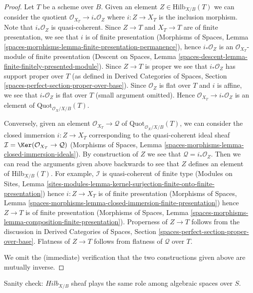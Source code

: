 \begin{proof}
Let $T$ be a scheme over $B$. Given an element
$Z \in \text{Hilb}_{X/B}(T)$ we can consider the
quotient $\mathcal{O}_{X_T} \to i_*\mathcal{O}_Z$
where $i : Z \to X_T$ is the inclusion morphism.
Note that $i_*\mathcal{O}_Z$ is quasi-coherent.
Since $Z \to T$ and $X_T \to T$ are of finite presentation,
we see that $i$ is of finite presentation (Morphisms of Spaces, Lemma
\ref{spaces-morphisms-lemma-finite-presentation-permanence}), hence
$i_*\mathcal{O}_Z$ is an $\mathcal{O}_{X_T}$-module of
finite presentation (Descent on Spaces, Lemma
\ref{spaces-descent-lemma-finite-finitely-presented-module}).
Since $Z \to T$ is proper we see that $i_*\mathcal{O}_Z$
has support proper over $T$ (as defined in
Derived Categories of Spaces, Section
\ref{spaces-perfect-section-proper-over-base}).
Since $\mathcal{O}_Z$ is flat
over $T$ and $i$ is affine, we see that $i_*\mathcal{O}_Z$
is flat over $T$ (small argument omitted). Hence
$\mathcal{O}_{X_T} \to i_*\mathcal{O}_Z$
is an element of $\text{Quot}_{\mathcal{O}_X/X/B}(T)$.

\medskip\noindent
Conversely, given an element $\mathcal{O}_{X_T} \to \mathcal{Q}$
of $\text{Quot}_{\mathcal{O}_X/X/B}(T)$, we can consider
the closed immersion $i : Z \to X_T$ corresponding to
the quasi-coherent ideal sheaf
$\mathcal{I} = \Ker(\mathcal{O}_{X_T} \to \mathcal{Q})$
(Morphisms of Spaces, Lemma
\ref{spaces-morphisms-lemma-closed-immersion-ideals}).
By construction of $Z$ we see that $\mathcal{Q} = i_*\mathcal{O}_Z$.
Then we can read the arguments given above backwards to see
that $Z$ defines an element of $\text{Hilb}_{X/B}(T)$.
For example, $\mathcal{I}$ is quasi-coherent of finite type
(Modules on Sites, Lemma
\ref{sites-modules-lemma-kernel-surjection-finite-onto-finite-presentation})
hence $i : Z \to X_T$ is of finite presentation
(Morphisms of Spaces, Lemma
\ref{spaces-morphisms-lemma-closed-immersion-finite-presentation})
hence $Z \to T$ is of finite presentation
(Morphisms of Spaces, Lemma
\ref{spaces-morphisms-lemma-composition-finite-presentation}).
Properness of $Z \to T$ follows from the discussion in
Derived Categories of Spaces, Section
\ref{spaces-perfect-section-proper-over-base}.
Flatness of $Z \to T$ follows from flatness of $\mathcal{Q}$ over $T$.

\medskip\noindent
We omit the (immediate) verification that the two constructions given
above are mutually inverse.
\end{proof}

\noindent
Sanity check: $\mathit{Hilb}_{X/B}$
sheaf plays the same role among algebraic spaces over $S$.

